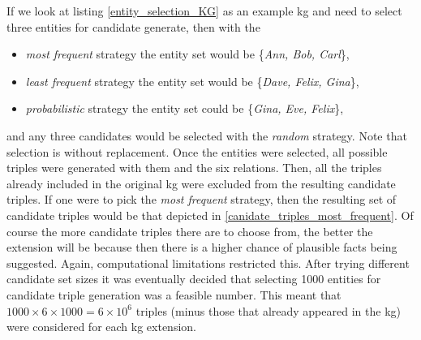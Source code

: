 If we look at listing \ref{entity_selection_KG} as an example \gls{kg} and need to select three entities for candidate generate, then with the 
\begin{itemize}
    \item \textit{most frequent} strategy the entity set would be \{\textit{Ann, Bob, Carl}\},
    \item \textit{least frequent} strategy the entity set would be \{\textit{Dave, Felix, Gina}\},
    \item \textit{probabilistic} strategy the entity set could be \{\textit{Gina, Eve, Felix}\},
\end{itemize}
and any three candidates would be selected with the \textit{random} strategy. Note that selection is without replacement. Once the entities were selected, all possible triples were generated with them and the six relations. Then, all the triples already included in the original \gls{kg} were excluded from the resulting candidate triples. If one were to pick the \textit{most frequent} strategy, then the resulting set of candidate triples would be that depicted in \cref{canidate_triples_most_frequent}. Of course the more candidate triples there are to choose from, the better the extension will be because then there is a higher chance of plausible facts being suggested. Again, computational limitations restricted this. After trying different candidate set sizes it was eventually decided that selecting 1000 entities for candidate triple generation was a feasible number. This meant that $ 1000 \times 6 \times 1000 = 6 \times 10^6 $ triples (minus those that already appeared in the \gls{kg}) were considered for each \gls{kg} extension.


